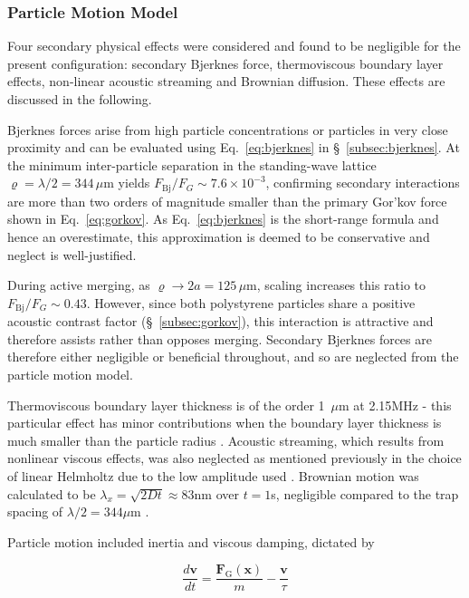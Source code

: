 \documentclass[11pt,a4paper]{article}
\begin{document}
\subsubsection{Particle Motion Model}

Four secondary physical effects were considered and found to be negligible for the present configuration: secondary Bjerknes force, thermoviscous boundary layer effects, non-linear acoustic streaming and Brownian diffusion. These effects are discussed in the following. 

Bjerknes forces arise from high particle concentrations or particles in very close proximity and can be evaluated using Eq.~\ref{eq:bjerknes} in \S~\ref{subsec:bjerknes}. At the minimum inter-particle separation in the standing-wave lattice $\varrho = \lambda/2 = 344\,\mu\mathrm{m}$ yields $F_{\mathrm{Bj}}/F_G \sim 7.6\times10^{-3}$, confirming secondary interactions are more than two orders of magnitude smaller than the primary Gor'kov force shown in Eq.~\ref{eq:gorkov}. As Eq.~\ref{eq:bjerknes} is the short-range formula and hence an overestimate, this approximation is deemed to be conservative and neglect is well-justified. 

During active merging, as  $\varrho\rightarrow 2a = 125\,\mu\mathrm{m}$, scaling increases this ratio to $F_{\mathrm{Bj}}/F_G \sim 0.43$. However, since both polystyrene particles share a positive acoustic contrast factor (\S~\ref{subsec:gorkov}), this interaction is attractive \cite{silva2014} and therefore assists rather than opposes merging. Secondary Bjerknes forces are therefore either negligible or beneficial throughout, and so are neglected from the particle motion model.


Thermoviscous boundary layer thickness is of the order 1~$\mu\text{m}$ at 2.15$\mathrm{MHz}$ - this particular effect has minor contributions when the boundary layer thickness is much smaller than the particle radius \cite{settnes2012forces}. Acoustic streaming, which results from nonlinear viscous effects, was also neglected as mentioned previously in the choice of linear Helmholtz due to the low amplitude used \cite{muller2012acoustophoresis}. Brownian motion was calculated to be $\lambda_x = \sqrt{2Dt} \approx 83 \mathrm{nm}$ over $t=1$s, negligible compared to the trap spacing of $\lambda/2=344\mu\mathrm{m}$ \cite{einstein1905brownian}. 

Particle motion included inertia and viscous damping, dictated by 

\begin{equation}
\frac{d\mathbf{v}}{dt} = \frac{\mathbf{F}_{\mathrm{G}}(\mathbf{x})}{m} - \frac{\mathbf{v}}{\tau}
\label{eq:overdamped-motion}
\end{equation}
\end{document}
